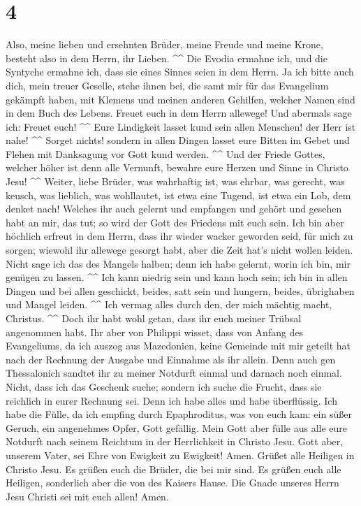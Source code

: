 \hypertarget{section-2}{%
\section{4}\label{section-2}}

 Also, meine lieben und ersehnten Brüder, meine Freude und
meine Krone, besteht also in dem Herrn, ihr Lieben. \^{}\^{}
 Die Evodia ermahne ich, und die Syntyche ermahne ich,
dass sie eines Sinnes seien in dem Herrn.  Ja ich bitte
auch dich, mein treuer Geselle, stehe ihnen bei, die samt mir für das
Evangelium gekämpft haben, mit Klemens und meinen anderen Gehilfen,
welcher Namen sind in dem Buch des Lebens.  Freuet euch in
dem Herrn allewege! Und abermals sage ich: Freuet euch! \^{}\^{}
 Eure Lindigkeit lasset kund sein allen Menschen! der Herr
ist nahe! \^{}\^{}  Sorget nichts! sondern in allen Dingen
lasset eure Bitten im Gebet und Flehen mit Danksagung vor Gott kund
werden. \^{}\^{}  Und der Friede Gottes, welcher höher ist
denn alle Vernunft, bewahre eure Herzen und Sinne in Christo Jesu!
\^{}\^{}  Weiter, liebe Brüder, was wahrhaftig ist, was
ehrbar, was gerecht, was keusch, was lieblich, was wohllautet, ist etwa
eine Tugend, ist etwa ein Lob, dem denket nach!  Welches
ihr auch gelernt und empfangen und gehört und gesehen habt an mir, das
tut; so wird der Gott des Friedens mit euch sein.  Ich
bin aber höchlich erfreut in dem Herrn, dass ihr wieder wacker geworden
seid, für mich zu sorgen; wiewohl ihr allewege gesorgt habt, aber die
Zeit hat's nicht wollen leiden.  Nicht sage ich das des
Mangels halben; denn ich habe gelernt, worin ich bin, mir genügen zu
lassen. \^{}\^{}  Ich kann niedrig sein und kann hoch
sein; ich bin in allen Dingen und bei allen geschickt, beides, satt sein
und hungern, beides, übrighaben und Mangel leiden. \^{}\^{}
 Ich vermag alles durch den, der mich mächtig macht,
Christus. \^{}\^{}  Doch ihr habt wohl getan, dass ihr
euch meiner Trübsal angenommen habt.  Ihr aber von
Philippi wisset, dass von Anfang des Evangeliums, da ich auszog aus
Mazedonien, keine Gemeinde mit mir geteilt hat nach der Rechnung der
Ausgabe und Einnahme als ihr allein.  Denn auch gen
Thessalonich sandtet ihr zu meiner Notdurft einmal und darnach noch
einmal.  Nicht, dass ich das Geschenk suche; sondern ich
suche die Frucht, dass sie reichlich in eurer Rechnung sei.
 Denn ich habe alles und habe überflüssig. Ich habe die
Fülle, da ich empfing durch Epaphroditus, was von euch kam: ein süßer
Geruch, ein angenehmes Opfer, Gott gefällig.  Mein Gott
aber fülle aus alle eure Notdurft nach seinem Reichtum in der
Herrlichkeit in Christo Jesu.  Gott aber, unserem Vater,
sei Ehre von Ewigkeit zu Ewigkeit! Amen.  Grüßet alle
Heiligen in Christo Jesu. Es grüßen euch die Brüder, die bei mir sind.
 Es grüßen euch alle Heiligen, sonderlich aber die von
des Kaisers Hause.  Die Gnade unseres Herrn Jesu Christi
sei mit euch allen! Amen.
